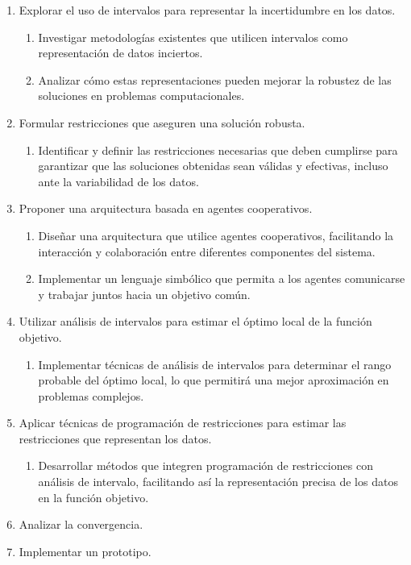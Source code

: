 \documentclass{article}
\begin{document}
\begin{enumerate}
\item Explorar el uso de intervalos para representar la incertidumbre en los datos.
\begin{enumerate}
\item Investigar metodologías existentes que utilicen intervalos como representación de datos inciertos.
\item Analizar cómo estas representaciones pueden mejorar la robustez de las soluciones en problemas computacionales.
\end{enumerate}

    \item Formular restricciones que aseguren una solución robusta.
    \begin{enumerate}
        \item Identificar y definir las restricciones necesarias que deben cumplirse para garantizar que las soluciones obtenidas sean válidas y efectivas, incluso ante la variabilidad de los datos.
    \end{enumerate}

    \item Proponer una arquitectura basada en agentes cooperativos.
    \begin{enumerate}
        \item Diseñar una arquitectura que utilice agentes cooperativos, facilitando la interacción y colaboración entre diferentes componentes del sistema.
        \item Implementar un lenguaje simbólico que permita a los agentes comunicarse y trabajar juntos hacia un objetivo común.
    \end{enumerate}

    \item Utilizar análisis de intervalos para estimar el óptimo local de la función objetivo.
    \begin{enumerate}
        \item Implementar técnicas de análisis de intervalos para determinar el rango probable del óptimo local, lo que permitirá una mejor aproximación en problemas complejos.
    \end{enumerate}

    \item Aplicar técnicas de programación de restricciones para estimar las restricciones que representan los datos.
    \begin{enumerate}
        \item Desarrollar métodos que integren programación de restricciones con análisis de intervalo, facilitando así la representación precisa de los datos en la función objetivo.
    \end{enumerate}

    \item Analizar la convergencia.

    \item Implementar un prototipo.

\end{enumerate}
\end{document}
